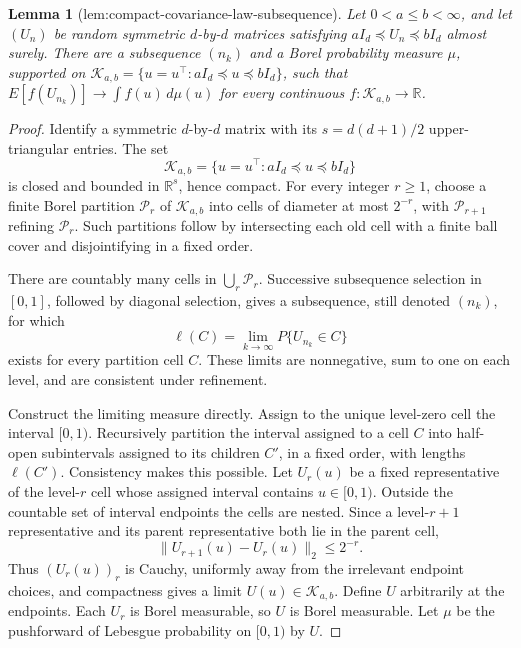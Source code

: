\documentclass{article}
\newtheorem{lemma}{Lemma}
\begin{document}
\begin{lemma}[lem:compact-covariance-law-subsequence]\label{lem:compact-covariance-law-subsequence}
Let \(0<a\le b<\infty\), and let \((U_n)\) be random symmetric \(d\)-by-\(d\) matrices satisfying \(aI_d\preceq U_n\preceq bI_d\) almost surely. There are a subsequence \((n_k)\) and a Borel probability measure \(\mu\), supported on \(\mathcal K_{a,b}=\{u=u^\top:aI_d\preceq u\preceq bI_d\}\), such that \(E[f(U_{n_k})]\to\int f(u)\,d\mu(u)\) for every continuous \(f:\mathcal K_{a,b}\to\mathbb R\).
\end{lemma}
\begin{proof}
Identify a symmetric \(d\)-by-\(d\) matrix with its \(s=d(d+1)/2\) upper-triangular entries. The set
\[
 \mathcal K_{a,b}=\{u=u^\top:aI_d\preceq u\preceq bI_d\}
\]
is closed and bounded in \(\mathbb R^s\), hence compact. For every integer \(r\ge1\), choose a finite Borel partition \(\mathcal P_r\) of \(\mathcal K_{a,b}\) into cells of diameter at most \(2^{-r}\), with \(\mathcal P_{r+1}\) refining \(\mathcal P_r\). Such partitions follow by intersecting each old cell with a finite ball cover and disjointifying in a fixed order.

There are countably many cells in \(\bigcup_r\mathcal P_r\). Successive subsequence selection in \([0,1]\), followed by diagonal selection, gives a subsequence, still denoted \((n_k)\), for which
\[
 \ell(C)=\lim_{k\to\infty}P\{U_{n_k}\in C\}
\tag{1}
\]
exists for every partition cell \(C\). These limits are nonnegative, sum to one on each level, and are consistent under refinement.

Construct the limiting measure directly. Assign to the unique level-zero cell the interval \([0,1)\). Recursively partition the interval assigned to a cell \(C\) into half-open subintervals assigned to its children \(C'\), in a fixed order, with lengths \(\ell(C')\). Consistency makes this possible. Let \(U_r(u)\) be a fixed representative of the level-\(r\) cell whose assigned interval contains \(u\in[0,1)\). Outside the countable set of interval endpoints the cells are nested. Since a level-\(r+1\) representative and its parent representative both lie in the parent cell,
\[
 \|U_{r+1}(u)-U_r(u)\|_2\le2^{-r}.
\tag{2}
\]
Thus \((U_r(u))_r\) is Cauchy, uniformly away from the irrelevant endpoint choices, and compactness gives a limit \(U(u)\in\mathcal K_{a,b}\). Define \(U\) arbitrarily at the endpoints. Each \(U_r\) is Borel measurable, so \(U\) is Borel measurable. Let \(\mu\) be the pushforward of Lebesgue probability on \([0,1)\) by \(U\).


\end{proof}
\end{document}
